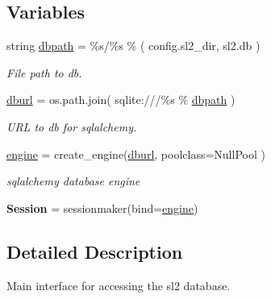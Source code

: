 \subsection*{Variables}
\begin{DoxyCompactItemize}
\item 
\mbox{\label{namespacedb_a60759a62cf76651baa120ef1e74b8519}} 
string \mbox{\hyperlink{namespacedb_a60759a62cf76651baa120ef1e74b8519}{dbpath}} = \textquotesingle{}\%s/\%s\textquotesingle{} \% ( config.\+sl2\+\_\+dir, \textquotesingle{}sl2.\+db\textquotesingle{} )
\begin{DoxyCompactList}\small\item\em File path to db. \end{DoxyCompactList}\item 
\mbox{\label{namespacedb_a966575be1dd488f47e30cb72288566d1}} 
\mbox{\hyperlink{namespacedb_a966575be1dd488f47e30cb72288566d1}{dburl}} = os.\+path.\+join( \textquotesingle{}sqlite\+:///\%s\textquotesingle{} \% \mbox{\hyperlink{namespacedb_a60759a62cf76651baa120ef1e74b8519}{dbpath}} )
\begin{DoxyCompactList}\small\item\em U\+RL to db for sqlalchemy. \end{DoxyCompactList}\item 
\mbox{\label{namespacedb_abb6bc97a20a679336952d2d55c398be5}} 
\mbox{\hyperlink{namespacedb_abb6bc97a20a679336952d2d55c398be5}{engine}} = create\+\_\+engine(\mbox{\hyperlink{namespacedb_a966575be1dd488f47e30cb72288566d1}{dburl}}, poolclass=Null\+Pool )
\begin{DoxyCompactList}\small\item\em sqlalchemy database engine \end{DoxyCompactList}\item 
\mbox{\label{namespacedb_a8250147576dfed202ed3a7b7fae6390c}} 
{\bfseries Session} = sessionmaker(bind=\mbox{\hyperlink{namespacedb_abb6bc97a20a679336952d2d55c398be5}{engine}})
\end{DoxyCompactItemize}


\subsection{Detailed Description}
Main interface for accessing the sl2 database. 

